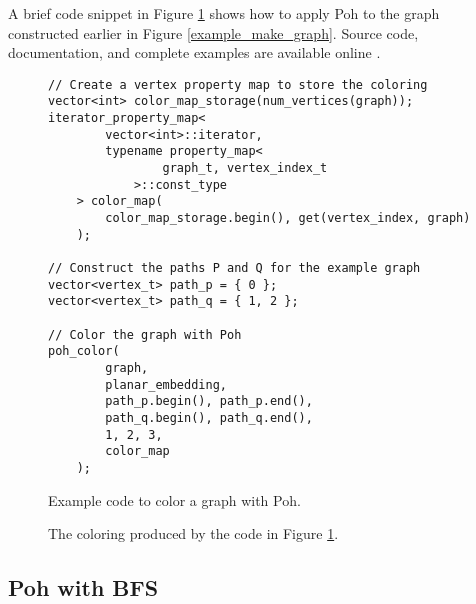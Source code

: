 \documentclass[letterpaper, 12pt]{article}
\theoremstyle{thm}
\begin{document}
A brief code snippet in Figure \ref{example_poh} shows how to apply Poh to the
graph constructed earlier in Figure \ref{example_make_graph}.
Source code, documentation, and complete examples are available online
\cite{code}.

\begin{figure}
\begin{lstlisting}[frame=single]
// Create a vertex property map to store the coloring
vector<int> color_map_storage(num_vertices(graph));
iterator_property_map<
        vector<int>::iterator,
        typename property_map<
                graph_t, vertex_index_t
            >::const_type
    > color_map(
        color_map_storage.begin(), get(vertex_index, graph)
    );

// Construct the paths P and Q for the example graph
vector<vertex_t> path_p = { 0 };
vector<vertex_t> path_q = { 1, 2 };

// Color the graph with Poh
poh_color(
        graph,
        planar_embedding,
        path_p.begin(), path_p.end(),
        path_q.begin(), path_q.end(),
        1, 2, 3,
        color_map
    );
\end{lstlisting}
\caption{Example code to color a graph with Poh.}
\label{example_poh}
\end{figure}

\begin{figure}
\begin{center}
\end{center}
\caption{The coloring produced by the code in Figure \ref{example_poh}.}
\end{figure}

\subsection{Poh with BFS}
\end{document}
